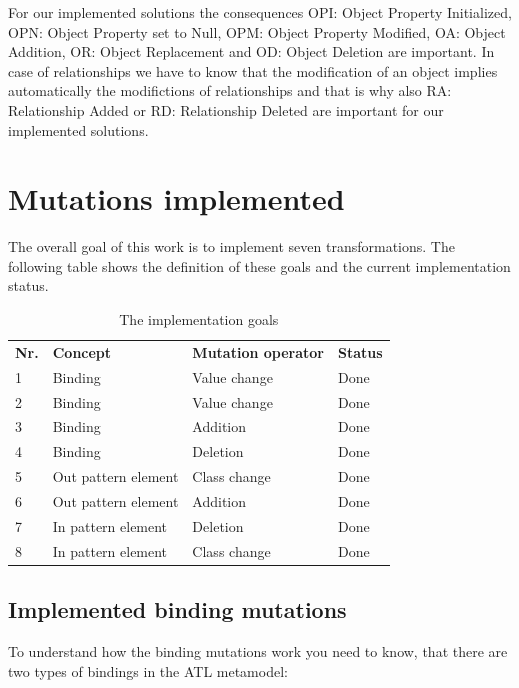 \documentclass{llncs}
\begin{document}
For our implemented solutions the consequences OPI: Object Property
Initialized, OPN: Object Property set to Null, OPM:
Object Property Modified, OA: Object
Addition, OR: Object Replacement and OD: Object Deletion are important. In case
of relationships we have to know that the modification of an object implies
automatically the modifictions of relationships and that is why also RA:
Relationship Added or RD: Relationship Deleted are important for our implemented
solutions.

\section{Mutations implemented}

The overall goal of this work is to implement seven transformations. The following table shows the definition of these goals and the current implementation status.
\begin{table}[h]
\begin{tabular}{llll}
\textbf{Nr.} & \textbf{Concept}    & \textbf{Mutation operator} & \textbf{Status} \\
1            & Binding             & Value change               & Done            \\
2            & Binding             & Value change               & Done            \\
3            & Binding             & Addition                   & Done                \\
4            & Binding             & Deletion                   & Done            \\
5            & Out pattern element & Class change               & Done                \\
6            & Out pattern element & Addition                   & Done                \\
7            & In pattern element  & Deletion                   & Done            \\
8            & In pattern element  & Class change               & Done               
\label{tbl:goals}
\end{tabular}
\caption{The implementation goals}
\end{table}

\subsection{Implemented binding mutations}

To understand how the binding mutations work you need to know, that there are two types of bindings in the ATL metamodel:
\end{document}
